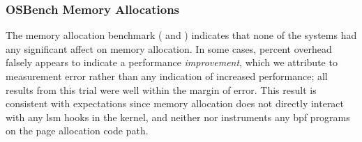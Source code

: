 \subsubsection{OSBench Memory Allocations}

The memory allocation benchmark ( and
) indicates that none of the systems had any significant affect on
memory allocation. In some cases, percent overhead falsely appears to indicate
a performance \textit{improvement}, which we attribute to measurement error rather than
any indication of increased performance; all results from this trial were well within the
margin of error. This result is consistent with expectations since memory allocation does
not directly interact with any \gls{lsm} hooks in the kernel, and neither \bpfbox{} nor
\bpfcontain{} instruments any \gls{bpf} programs on the page allocation code path.





